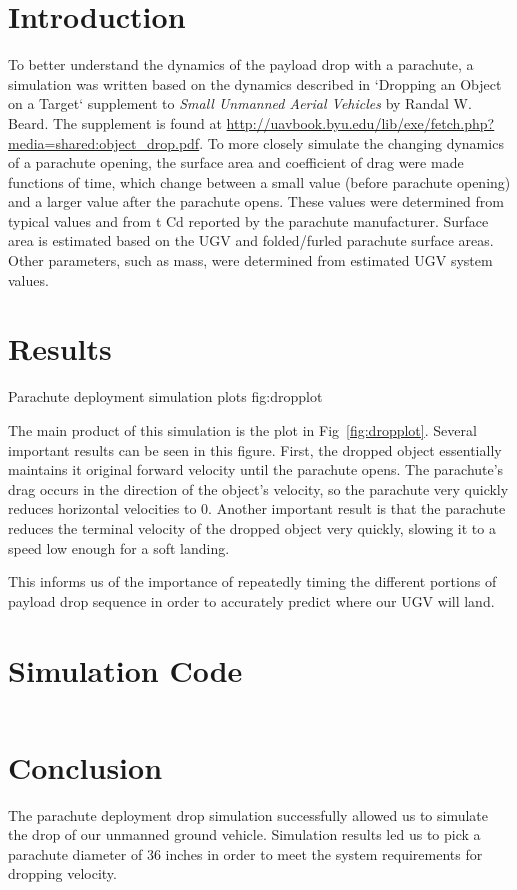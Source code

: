 \documentclass[]{auvsi_doc}
\begin{document}
\begin{AUVSITitlePage}
\begin{artifacttable}
\end{artifacttable}
\end{AUVSITitlePage}


\section*{Introduction}
To better understand the dynamics of the payload drop with a parachute, a simulation was written based on the dynamics described in `Dropping an Object on a Target` supplement to \textit{Small Unmanned Aerial Vehicles} by Randal W. Beard.
The supplement is found at \url{http://uavbook.byu.edu/lib/exe/fetch.php?media=shared:object_drop.pdf}.
To more closely simulate the changing dynamics of a parachute opening, the surface area and coefficient of drag were made functions of time, which change between a small value (before parachute opening) and a larger value after the parachute opens. These values were determined from typical values and from t Cd reported by the parachute manufacturer. Surface area is estimated based on the UGV and folded/furled parachute surface areas. Other parameters, such as mass, were determined from estimated UGV system values.

\section*{Results}
{\textwidth}
{Parachute deployment simulation plots}
{fig:dropplot}

The main product of this simulation is the plot in Fig~\ref{fig:dropplot}. Several important results can be seen in this figure. First, the dropped object essentially maintains it original forward velocity until the parachute opens. The parachute's drag occurs in the direction of the object's velocity, so the parachute very quickly reduces horizontal velocities to 0.
Another important result is that the parachute reduces the terminal velocity of the dropped object very quickly, slowing it to a speed low enough for a soft landing.

This informs us of the importance of repeatedly timing the different portions of payload drop sequence in order to accurately predict where our UGV will land.

\section*{Simulation Code}
\inputminted[fontsize=\footnotesize]{python}{drop.py}
\section*{Conclusion}

The parachute deployment drop simulation successfully allowed us to simulate the drop of our unmanned ground vehicle. Simulation results led us to pick a parachute diameter of 36 inches in order to meet the system requirements for dropping velocity.
\end{document}
